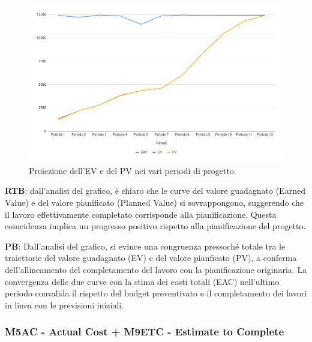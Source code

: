 \vspace{0.3cm}

\begin{figure}[H]
    \centering
    \includegraphics[width=1\textwidth]{../Images/PianoDiQualifica/EV_PV.png}
    \caption{Proiezione dell’EV e del PV nei vari periodi di progetto.}
    \label{fig:3}
\end{figure}

\vspace{0.2cm}

\textbf{RTB}: dall'analisi del grafico, è chiaro che le curve del valore guadagnato (Earned Value) e del valore pianificato (Planned Value) si sovrappongono, suggerendo che il lavoro effettivamente completato corrisponde alla pianificazione. 
Questa coincidenza implica un progresso positivo rispetto alla pianificazione del progetto.

\vspace{0.2cm}
\textbf{PB}:  Dall'analisi del grafico, si evince una congruenza pressoché totale tra le traiettorie del valore guadagnato (EV) e del valore pianficato (PV), a conferma dell'allineamento del completamento del lavoro con la pianificazione originaria.
La convergenza delle due curve con la stima dei costi totali (EAC) nell'ultimo periodo convalida il rispetto del budget preventivato e il completamento dei lavori in linea con le previsioni iniziali.

\subsubsection{M5AC - Actual Cost + M9ETC - Estimate to Complete}

\vspace{0.3cm}

